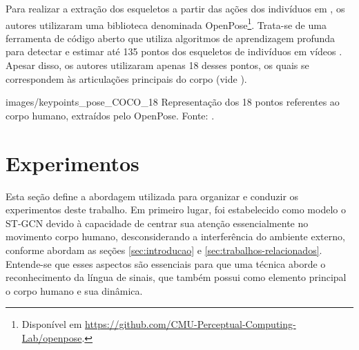 Para realizar a extração dos esqueletos a partir das ações dos indivíduos em \cite{st-gcn-2018}, os autores utilizaram uma biblioteca denominada OpenPose\footnote{
    Disponível em \url{https://github.com/CMU-Perceptual-Computing-Lab/openpose}.
}. Trata-se de uma ferramenta de código aberto que utiliza algoritmos de aprendizagem profunda para detectar e estimar até 135 pontos dos esqueletos de indivíduos em vídeos \cite{cao-realtime-2017, simon-hand-2017, wei-cpm-2016}. Apesar disso, os autores utilizaram apenas 18 desses pontos, os quais se correspondem às articulações principais do corpo (vide ). 

    {images/keypoints_pose_COCO_18}
    {Representação dos 18 pontos referentes ao corpo humano, extraídos pelo OpenPose. Fonte: \cite{openpose-output-2018}.}



\section{Experimentos} %
\label{sec:experimentos}

Esta seção define a abordagem utilizada para organizar e conduzir os experimentos deste trabalho. Em primeiro lugar, foi estabelecido como modelo o ST-GCN devido à capacidade de centrar sua atenção essencialmente no movimento corpo humano, desconsiderando a interferência do ambiente externo, conforme abordam as seções \ref{sec:introducao} e \ref{sec:trabalhos-relacionados}. Entende-se que esses aspectos são essenciais para que uma técnica aborde o reconhecimento da língua de sinais, que também possui como elemento principal o corpo humano e sua dinâmica.

